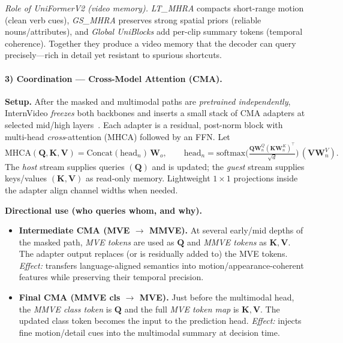 \begin{enrichment}
\begin{enrichment}
        \emph{Role of UniFormerV2 (video memory).} \emph{LT\_MHRA} compacts short-range motion (clean verb cues), \emph{GS\_MHRA} preserves strong spatial priors (reliable nouns/attributes), and \emph{Global UniBlocks} add per-clip summary tokens (temporal coherence). Together they produce a video memory that the decoder can query precisely—rich in detail yet resistant to spurious shortcuts.
        
        \paragraph{3) Coordination — Cross-Model Attention (CMA).}
        \textbf{Setup.} After the masked and multimodal paths are \emph{pretrained independently}, InternVideo \emph{freezes} both backbones and inserts a small stack of CMA adapters at selected mid/high layers~\cite{wang2022_internvideo}. Each adapter is a residual, post-norm block with multi-head \emph{cross}-attention (MHCA) followed by an FFN. Let
        \[
        \mathrm{MHCA}(\bm{Q},\bm{K},\bm{V})=\mathrm{Concat}(\mathrm{head}_n)\,\bm{W}_o,\qquad
        \mathrm{head}_n=\mathrm{softmax}\!\Big(\tfrac{\bm{Q}\bm{W}^Q_n(\bm{K}\bm{W}^K_n)^{\!\top}}{\sqrt{d}}\Big)\,(\bm{V}\bm{W}^V_n).
        \]
        The \emph{host} stream supplies queries \((\bm{Q})\) and is updated; the \emph{guest} stream supplies keys/values \((\bm{K},\bm{V})\) as read-only memory. Lightweight $1{\times}1$ projections inside the adapter align channel widths when needed.
        
        \textbf{Directional use (who queries whom, and why).}
        \begin{itemize}
            \item \textbf{Intermediate CMA (MVE $\rightarrow$ MMVE).} At several early/mid depths of the masked path, \emph{MVE tokens} are used as \(\bm{Q}\) and \emph{MMVE tokens} as \(\bm{K},\bm{V}\). The adapter output replaces (or is residually added to) the MVE tokens. \emph{Effect:} transfers language-aligned semantics into motion/appearance-coherent features while preserving their temporal precision.
            \item \textbf{Final CMA (MMVE cls $\rightarrow$ MVE).} Just before the multimodal head, the \emph{MMVE class token} is \(\bm{Q}\) and the full \emph{MVE token map} is \(\bm{K},\bm{V}\). The updated class token becomes the input to the prediction head. \emph{Effect:} injects fine motion/detail cues into the multimodal summary at decision time.
        \end{itemize}
        

\end{enrichment}
\end{enrichment}
